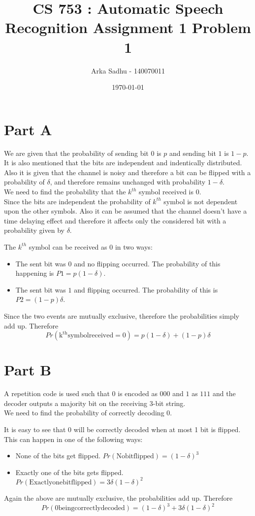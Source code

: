 \documentclass{article}
\title{CS 753 : Automatic Speech Recognition Assignment 1 Problem 1}
\author{Arka Sadhu - 140070011}
\date{\today}
\begin{document}
\maketitle
\section{Part A}
We are given that  the probability of sending bit $0$ is $p$ and sending bit $1$ is $1-p$. It is also mentioned that the bits are independent and indentically distributed.\\
Also it is given that the channel is noisy and therefore a bit can be flipped with a probability of $\delta$, and therefore  remains unchanged with probability $1-\delta$.\\
We need to find the probability that the $k^{th}$ symbol received is $0$.\\

Since the bits are independent the probability of $k^{th}$ symbol is not dependent upon the other symbols. Also it can be assumed that the channel doesn't have a time delaying effect and therefore it affects only the considered bit with a probability given by $\delta$.

The $k^{th}$ symbol can be received as $0$ in two ways:
\begin{itemize}
\item The sent bit was $0$ and no flipping occurred. The probability of this happening is $P1 = p(1-\delta)$.
\item The sent bit was $1$ and flipping occurred. The probability of this is $P2 = (1-p)\delta$.
\end{itemize}

Since the two events are mutually exclusive, therefore the probabilities simply add up.
Therefore
\begin{equation}
  \label{eq:q1a}
  Pr(\mathrm{k^{th} symbol received = 0}) = p(1-\delta) + (1-p)\delta
\end{equation}

\section{Part B}
A repetition code is used such that $0$ is encoded as $000$ and $1$ as $111$ and the decoder outputs a majority bit on the receiving 3-bit string.\\
We need to find the probability of correctly decoding $0$.

It is easy to see that $0$ will be correctly decoded when at most 1 bit is flipped. This can happen in one of the following ways:
\begin{itemize}
\item None of the bits get flipped. $Pr(\mathrm{No bit flipped}) = (1-\delta)^3$
\item Exactly one of the bits gets flipped. $Pr(\mathrm{Exactly one bit flipped}) = 3 \delta (1 - \delta)^2$
\end{itemize}
Again the above are mutually exclusive, the probabilities add up.
Therefore
\begin{equation}
  \label{eq:q1b}
  Pr(\mathrm{0 being correctly decoded}) = (1 - \delta)^3 + 3 \delta (1 - \delta)^2
\end{equation}
\end{document}
